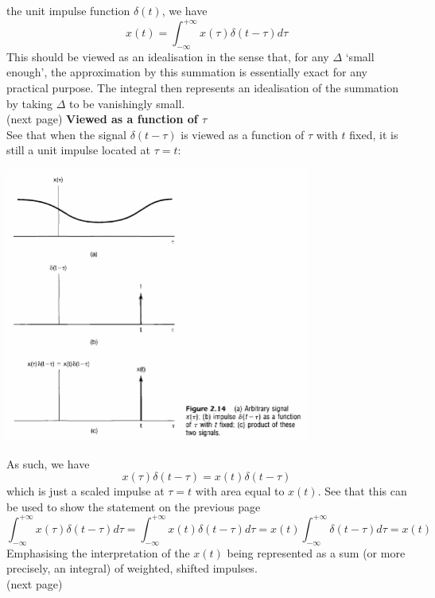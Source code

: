 \documentclass{report}
\begin{document}
the unit impulse function $\delta(t)$, we have
\begin{equation*}
x(t)=\int^{+\infty}_{-\infty}x(\tau)\delta(t-\tau)d\tau
\end{equation*}
This should be viewed as an idealisation in the sense that, for any $\Delta$ `small enough', the approximation by this summation
is essentially exact for any practical purpose. The
integral then represents an idealisation of the summation by
taking $\Delta$ to be vanishingly small.\\
(next page)\newpage
\noindent\textbf{Viewed as a function of $\tau$}\\
See that when the signal $\delta(t-\tau)$ is viewed as a function of $\tau$ with $t$ fixed, it is still a unit impulse located at 
$\tau=t$:
\begin{center}
\includegraphics[width=10cm]{a30}\\
\end{center}
As such, we have
\begin{equation*}
x(\tau)\delta(t-\tau)=x(t)\delta(t-\tau)
\end{equation*}
which is just a scaled impulse at $\tau=t$ with area equal to $x(t)$. See that this can be used to show the statement on the
previous page
\begin{equation*}
\int^{+\infty}_{-\infty}x(\tau)\delta(t-\tau)d\tau=
\int^{+\infty}_{-\infty}x(t)\delta(t-\tau)d\tau=
x(t)\int^{+\infty}_{-\infty}\delta(t-\tau)d\tau=x(t)
\end{equation*}
Emphasising the interpretation of the $x(t)$ being represented as a sum (or more precisely, an integral) of weighted, shifted
impulses.\\
(next page)\newpage
\end{document}
